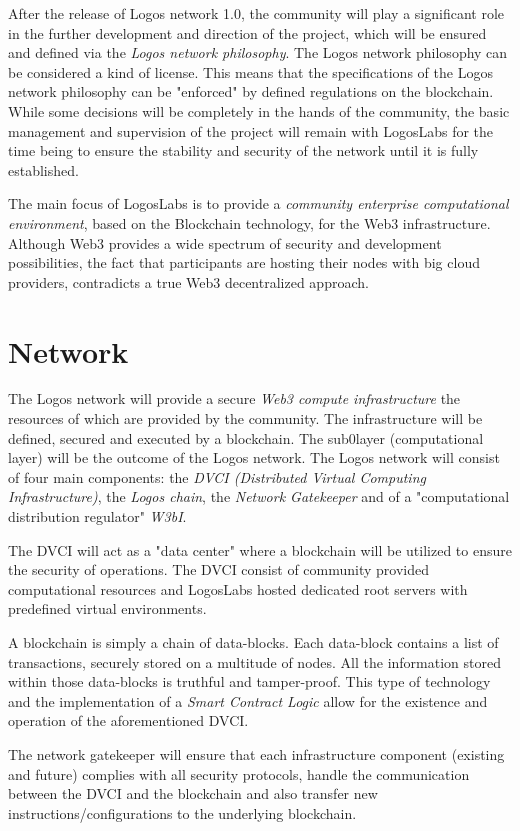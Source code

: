 \documentclass[]{article}
\begin{document}
After the release of Logos network 1.0, the community will play a significant role in the further development and direction of the project, which will be ensured and defined via the \textit{Logos network philosophy}.
The Logos network philosophy can be considered a kind of license.
This means that the specifications of the Logos network philosophy can be "enforced" by defined regulations on the blockchain.
While some decisions will be completely in the hands of the community, the basic management and supervision of the project will remain with LogosLabs for the time being to ensure the stability and security of the network until it is fully established.

The main focus of LogosLabs is to provide a \textit{community enterprise computational environment}, based on the Blockchain technology, for the Web3 infrastructure.
Although Web3 provides a wide spectrum of security and development possibilities, the fact that participants are hosting their nodes with big cloud providers, contradicts a true Web3 decentralized approach.

\section{Network}
The Logos network will provide a secure \textit{Web3 compute infrastructure} the resources of which are provided by the community.
The infrastructure will be defined, secured and executed by a blockchain.
The sub0layer (computational layer) will be the outcome of the Logos network.
The Logos network will consist of four main components: the \textit{DVCI (Distributed Virtual Computing Infrastructure)}, the \textit{Logos chain}, the \textit{Network Gatekeeper} and of a "computational distribution regulator" \textit{W3bI}. 

The DVCI will act as a "data center" where a blockchain will be utilized to ensure the security of operations.
The DVCI consist of community provided computational resources and LogosLabs hosted dedicated root servers with predefined virtual environments.

A blockchain is simply a chain of data-blocks.
Each data-block contains a list of transactions, securely stored on a multitude of nodes. 
All the information stored within those data-blocks is truthful and tamper-proof.
This type of technology and the implementation of a \textit{Smart Contract Logic} allow for the existence and operation of the aforementioned DVCI.

The network gatekeeper will ensure that each infrastructure component (existing and future) complies with all security protocols, handle the communication between the DVCI and the blockchain and also transfer new instructions/configurations to the underlying blockchain.
\end{document}

